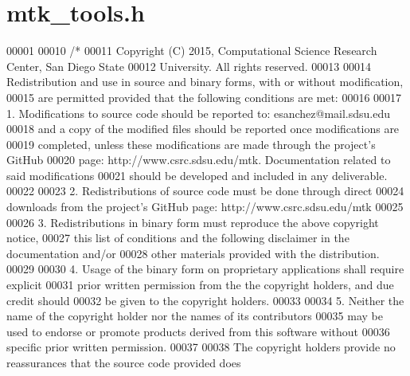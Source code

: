 \hypertarget{mtk__tools_8h_source}{\section{mtk\+\_\+tools.\+h}
\label{mtk__tools_8h_source}
}

\begin{DoxyCode}
00001 
00010 \textcolor{comment}{/*}
00011 \textcolor{comment}{Copyright (C) 2015, Computational Science Research Center, San Diego State}
00012 \textcolor{comment}{University. All rights reserved.}
00013 \textcolor{comment}{}
00014 \textcolor{comment}{Redistribution and use in source and binary forms, with or without modification,}
00015 \textcolor{comment}{are permitted provided that the following conditions are met:}
00016 \textcolor{comment}{}
00017 \textcolor{comment}{1. Modifications to source code should be reported to: esanchez@mail.sdsu.edu}
00018 \textcolor{comment}{and a copy of the modified files should be reported once modifications are}
00019 \textcolor{comment}{completed, unless these modifications are made through the project's GitHub}
00020 \textcolor{comment}{page: http://www.csrc.sdsu.edu/mtk. Documentation related to said modifications}
00021 \textcolor{comment}{should be developed and included in any deliverable.}
00022 \textcolor{comment}{}
00023 \textcolor{comment}{2. Redistributions of source code must be done through direct}
00024 \textcolor{comment}{downloads from the project's GitHub page: http://www.csrc.sdsu.edu/mtk}
00025 \textcolor{comment}{}
00026 \textcolor{comment}{3. Redistributions in binary form must reproduce the above copyright notice,}
00027 \textcolor{comment}{this list of conditions and the following disclaimer in the documentation and/or}
00028 \textcolor{comment}{other materials provided with the distribution.}
00029 \textcolor{comment}{}
00030 \textcolor{comment}{4. Usage of the binary form on proprietary applications shall require explicit}
00031 \textcolor{comment}{prior written permission from the the copyright holders, and due credit should}
00032 \textcolor{comment}{be given to the copyright holders.}
00033 \textcolor{comment}{}
00034 \textcolor{comment}{5. Neither the name of the copyright holder nor the names of its contributors}
00035 \textcolor{comment}{may be used to endorse or promote products derived from this software without}
00036 \textcolor{comment}{specific prior written permission.}
00037 \textcolor{comment}{}
00038 \textcolor{comment}{The copyright holders provide no reassurances that the source code provided does}

\end{DoxyCode}
